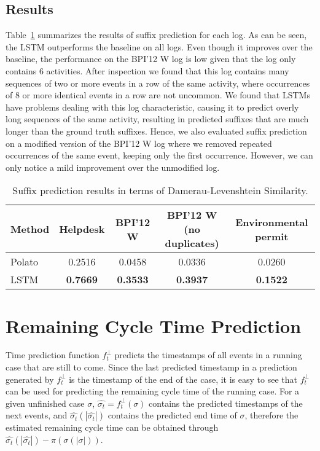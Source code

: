 \documentclass[runningheads,a4paper]{llncs}
\begin{document}
\subsection{Results}
Table~\ref{tab:suffixResults} summarizes the results of suffix prediction for each log. As can be seen, the LSTM outperforms the baseline \cite{Polato2016} on all logs. Even though it improves over the baseline, the performance on the BPI'12 W log is low given that the log only contains 6 activities. After inspection we found that this log contains many sequences of two or more events in a row of the same activity, where occurrences of 8 or more identical events in a row are not uncommon. We found that LSTMs have problems dealing with this log characteristic, causing it to predict overly long sequences of the same activity, resulting in predicted suffixes that are much longer than the ground truth suffixes. Hence, we also evaluated  suffix prediction on a modified version of the BPI'12 W log where we removed repeated occurrences of the same event, keeping only the first occurrence. However, we can only notice a mild improvement over the unmodified log. \begin{table}[hbtp]
	\vspace*{-2mm}
		\centering
	\begin{tabular}{l|c@{\quad}c@{\quad}c@{\quad}c}
		\toprule
		Method & Helpdesk & BPI'12 W & BPI'12 W (no duplicates) & Environmental permit\\
		\midrule
		Polato \cite{Polato2016} &0.2516 & 0.0458 & 0.0336 & 0.0260\\
		LSTM & \textbf{0.7669} & \textbf{0.3533} & \textbf{0.3937} & \textbf{0.1522}\\
		\bottomrule
	\end{tabular}
	\caption{Suffix prediction results in terms of Damerau-Levenshtein Similarity.}
	\label{tab:suffixResults}
	\vspace*{-4mm}
\end{table}

 
\section{Remaining Cycle Time Prediction}
\label{sec:remaining_cycle_time}


\enlargethispage{0.5\baselineskip}
Time prediction function $f_t^\bot$ predicts the timestamps of all events in a running case that are still to come. Since the last predicted timestamp in a prediction generated by $f_t^\bot$ is the timestamp of the end of the case, it is easy to see that $f_t^\bot$ can be used for predicting the remaining cycle time of the running case. For a given unfinished case $\sigma$, $\hat{\sigma_t}=f_t^\bot(\sigma)$ contains the predicted timestamps of the next events, and $\hat{\sigma_t}(|\hat{\sigma_t}|)$ contains the predicted end time of $\sigma$, therefore the estimated remaining cycle time can be obtained through $\hat{\sigma_t}(|\hat{\sigma_t}|)-\pi(\sigma(|\sigma|))$.
\end{document}
